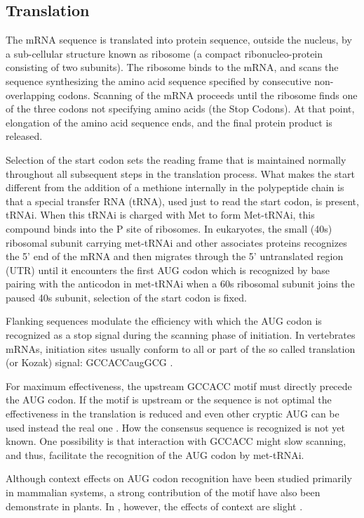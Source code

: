 \subsection*{Translation}

The mRNA sequence is translated into protein sequence, outside the
nucleus, by a sub-cellular structure known as ribosome (a compact
ribonucleo-protein consisting of two subunits). The ribosome binds to
the mRNA, and scans the sequence synthesizing the amino acid sequence
specified by consecutive non-overlapping codons. Scanning of the mRNA
proceeds until the ribosome finds one of the three codons not
specifying amino acids (the Stop Codons). At that point, elongation of
the amino acid sequence ends, and the final protein product is
released.

Selection of the start codon sets the reading frame that is maintained
normally throughout all subsequent steps in the translation
process. What makes the start different from the addition of a
methione internally in the polypeptide chain is that a special
transfer RNA (tRNA), used just to read the start codon, is present,
tRNAi. When this tRNAi is charged with Met to form Met-tRNAi, this
compound binds into the P site of ribosomes. In eukaryotes, the small
(40s) ribosomal subunit carrying met-tRNAi and other associates
proteins recognizes the 5' end of the mRNA and then migrates through
the 5' untranslated region (UTR) until it encounters the first AUG
codon which is recognized by base pairing with the anticodon in
met-tRNAi when a 60s ribosomal subunit joins the paused 40s subunit,
selection of the start codon is fixed.

Flanking sequences modulate the efficiency with which the AUG codon is
recognized as a stop signal during the scanning phase of
initiation. In vertebrates mRNAs, initiation sites usually conform to
all or part of the so called translation (or Kozak) signal:
GCCACCaugGCG \citep{kozak:1987a}.

For maximum effectiveness, the upstream GCCACC motif must directly
precede the AUG codon. If the motif is upstream or the sequence is not
optimal the effectiveness in the translation is reduced and even other
cryptic AUG can be used instead the real one \citep{kozak:1999a}. How
the consensus sequence is recognized is not yet known. One possibility
is that interaction with GCCACC might slow scanning, and thus,
facilitate the recognition of the AUG codon by met-tRNAi.

Although context effects on AUG codon recognition have been studied
primarily in mammalian systems, a strong contribution of the motif
have also been demonstrate in plants. In \Sc, however, the effects
of context are slight \citep{kozak:1999a}.

